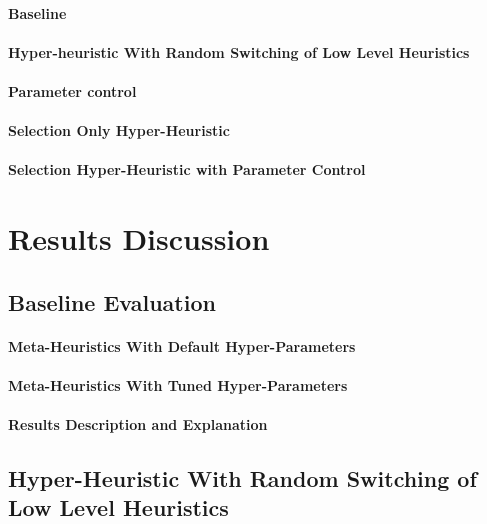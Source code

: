\paragraph{Baseline}

\paragraph{Hyper-heuristic With Random Switching of Low Level Heuristics}

\paragraph{Parameter control}

\paragraph{Selection Only Hyper-Heuristic}

\paragraph{Selection Hyper-Heuristic with Parameter Control}


\section{Results Discussion}

\subsection{Baseline Evaluation}

\paragraph{Meta-Heuristics With Default Hyper-Parameters}

\paragraph{Meta-Heuristics With Tuned Hyper-Parameters}

\paragraph{Results Description and Explanation}


\subsection{Hyper-Heuristic With Random Switching of Low Level Heuristics}

